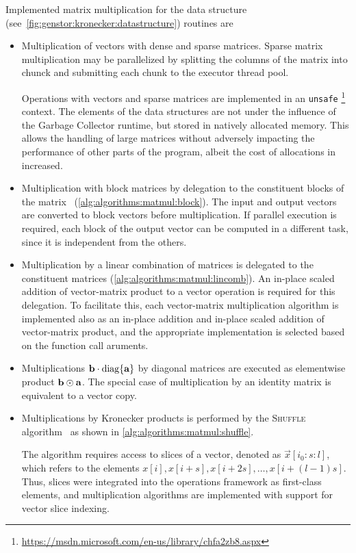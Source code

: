 Implemented matrix multiplication for the data structure
(see~\vref{fig:genstor:kronecker:datastructure}) routines are
\begin{itemize}
\item Multiplication of vectors with dense and sparse matrices. Sparse
  matrix multiplication may be parallelized by splitting the columns
  of the matrix into chunck and submitting each chunk to the executor
  thread pool.

  Operations with vectors and sparse matrices are implemented in an
  \texttt{unsafe}%
  \footnote{\url{https://msdn.microsoft.com/en-us/library/chfa2zb8.aspx}}
  context. The elements of the data structures are not under the
  influence of the Garbage Collector runtime, but stored in natively
  allocated memory. This allows the handling of large matrices without
  adversely impacting the performance of other parts of the program,
  albeit the cost of allocations in increased.
\item Multiplication with block matrices by delegation to the
  constituent blocks of the matrix%
  ~(\vref{alg:algorithms:matmul:block}). The input and output vectors
  are converted to block vectors before multiplication. If parallel
  execution is required, each block of the output vector can be
  computed in a different task, since it is independent from the
  others.
\item Multiplication by a linear combination of matrices is delegated
  to the constituent matrices
  (\vref{alg:algorithms:matmul:lincomb}). An in-place scaled addition
  of vector-matrix product to a vector operation is required for this
  delegation. To facilitate this, each vector-matrix multiplication
  algorithm is implemented also as an in-place addition and in-place
  scaled addition of vector-matrix product, and the appropriate
  implementation is selected based on the function call aruments.
\item Multiplications $\bm{\mathrm{b}} \cdot \operatorname{diag}\{\bm{\mathrm{a}}\}$ by diagonal
  matrices are executed as elementwise product
  $\bm{\mathrm{b}} \odot \bm{\mathrm{a}}$. The special case of multiplication by an
  identity matrix is equivalent to a vector copy.
\item Multiplications by Kronecker products is performed by the
  \textsc{Shuffle} algorithm~%
  \citep{DBLP:journals/informs/BuchholzCDK00,benoit2001memory} as
  shown in \vref{alg:algorithms:matmul:shuffle}.

  The algorithm requires access to slices of a vector, denoted as
  $\vec{x}[i_0{:}s{:}l]$, which refers to the elements
  $x[i], x[i + s], x[i + 2s], \ldots, x[i + (l - 1)s]$. Thus, slices
  were integrated into the operations framework as first-class
  elements, and multiplication algorithms are implemented with support
  for vector slice indexing.


\end{itemize}
